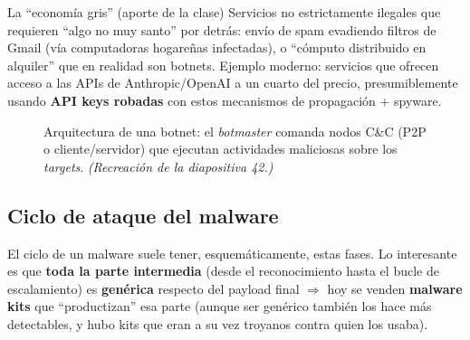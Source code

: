 \documentclass[11pt,a4paper]{article}
\begin{document}
\begin{practbox}{La ``economía gris'' (aporte de la clase)}
Servicios no estrictamente ilegales que requieren ``algo no muy santo'' por detrás: envío de
spam evadiendo filtros de Gmail (vía computadoras hogareñas infectadas), o ``cómputo distribuido
en alquiler'' que en realidad son botnets. Ejemplo moderno: servicios que ofrecen acceso a las
APIs de Anthropic/OpenAI a un cuarto del precio, presumiblemente usando \textbf{API keys
robadas} con estos mecanismos de propagación + spyware.
\end{practbox}

\begin{figure}[h]
\centering
{}
\caption{Arquitectura de una botnet: el \emph{botmaster} comanda nodos C\&C (P2P o
cliente/servidor) que ejecutan actividades maliciosas sobre los \emph{targets}.
\textit{(Recreación de la diapositiva 42.)}}
\end{figure}

\subsection{Ciclo de ataque del malware}
El ciclo de un malware suele tener, esquemáticamente, estas fases. Lo interesante es que
\textbf{toda la parte intermedia} (desde el reconocimiento hasta el bucle de escalamiento) es
\textbf{genérica} respecto del payload final $\Rightarrow$ hoy se venden \textbf{malware kits}
que ``productizan'' esa parte (aunque ser genérico también los hace más detectables, y hubo kits
que eran a su vez troyanos contra quien los usaba).
\end{document}
